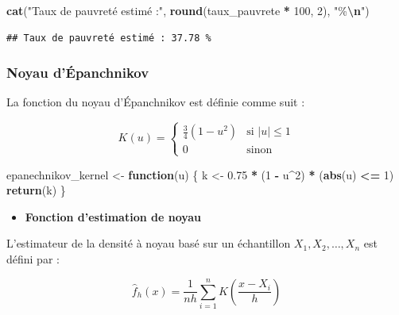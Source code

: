 \documentclass[
  12pt,
]{article}
\newenvironment{Shaded}{\begin{snugshade}}{\end{snugshade}}
\newcommand{\ControlFlowTok}[1]{\textcolor[rgb]{0.13,0.29,0.53}{\textbf{#1}}}
\newcommand{\DecValTok}[1]{\textcolor[rgb]{0.00,0.00,0.81}{#1}}
\newcommand{\FloatTok}[1]{\textcolor[rgb]{0.00,0.00,0.81}{#1}}
\newcommand{\FunctionTok}[1]{\textcolor[rgb]{0.13,0.29,0.53}{\textbf{#1}}}
\newcommand{\NormalTok}[1]{#1}
\newcommand{\OtherTok}[1]{\textcolor[rgb]{0.56,0.35,0.01}{#1}}
\newcommand{\SpecialCharTok}[1]{\textcolor[rgb]{0.81,0.36,0.00}{\textbf{#1}}}
\newcommand{\StringTok}[1]{\textcolor[rgb]{0.31,0.60,0.02}{#1}}
\providecommand{\tightlist}{%
  \setlength{\itemsep}{0pt}\setlength{\parskip}{0pt}}
\begin{document}
\begin{Shaded}
\begin{Highlighting}[]
\FunctionTok{cat}\NormalTok{(}\StringTok{"Taux de pauvreté estimé :"}\NormalTok{, }\FunctionTok{round}\NormalTok{(taux\_pauvrete }\SpecialCharTok{*} \DecValTok{100}\NormalTok{, }\DecValTok{2}\NormalTok{), }\StringTok{"\%}\SpecialCharTok{\textbackslash{}n}\StringTok{"}\NormalTok{)}
\end{Highlighting}
\end{Shaded}

\begin{verbatim}
## Taux de pauvreté estimé : 37.78 %
\end{verbatim}

\subsubsection{Noyau d'Épanchnikov}\label{noyau-duxe9panchnikov}

La fonction du noyau d'Épanchnikov est définie comme suit :

\[
K(u) =
\begin{cases}
\frac{3}{4}(1 - u^2) & \text{si } |u| \leq 1 \\
0 & \text{sinon}
\end{cases}
\]

\begin{Shaded}
\begin{Highlighting}[]
\NormalTok{epanechnikov\_kernel }\OtherTok{\textless{}{-}} \ControlFlowTok{function}\NormalTok{(u) \{}
\NormalTok{  k }\OtherTok{\textless{}{-}} \FloatTok{0.75} \SpecialCharTok{*}\NormalTok{ (}\DecValTok{1} \SpecialCharTok{{-}}\NormalTok{ u}\SpecialCharTok{\^{}}\DecValTok{2}\NormalTok{) }\SpecialCharTok{*}\NormalTok{ (}\FunctionTok{abs}\NormalTok{(u) }\SpecialCharTok{\textless{}=} \DecValTok{1}\NormalTok{)}
  \FunctionTok{return}\NormalTok{(k)}
\NormalTok{\}}
\end{Highlighting}
\end{Shaded}

\begin{itemize}
\tightlist
\item
  \textbf{Fonction d'estimation de noyau}
\end{itemize}

L'estimateur de la densité à noyau basé sur un échantillon
\(X_1, X_2, \dots, X_n\) est défini par :

\[
\hat{f}_h(x) = \frac{1}{n h} \sum_{i=1}^n K\left( \frac{x - X_i}{h} \right)
\]
\end{document}
